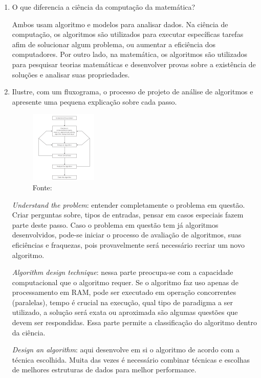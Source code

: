 \documentclass[12pt,a4paper]{article}
\begin{document}
\begin{enumerate}
	
		
	\item O que diferencia a ciência da computação da matemática?
	
	Ambos usam algoritmo e modelos para analisar dados. Na ciência de computação, os algoritmos são utilizados para executar específicas tarefas afim de solucionar algum problema, ou aumentar a eficiência dos computadores. Por outro lado, na matemática, os algoritmos são utilizados para pesquisar teorias matemáticas e desenvolver provas sobre a existência de soluções e analisar suas propriedades.
	
	
		
	\item Ilustre, com um fluxograma, o processo de projeto de análise de algoritmos e apresente uma pequena explicação sobre cada passo.
	
	\begin{figure}[H]
		\centering
		\includegraphics[scale=5]{images/algorithm_design.pdf}
		\caption{Fonte: \cite{levitin2008introduction}}
	\end{figure}

	\textit{Understand the problem}: entender completamente o problema em questão. Criar perguntas sobre, tipos de entradas, pensar em casos especiais fazem parte deste passo. Caso o problema em questão tem já algoritmos desenvolvidos, pode-se iniciar o processo de avaliação de algoritmos, suas eficiências e fraquezas, pois provavelmente será necessário recriar um novo algoritmo.
	
	\textit{Algorithm design technique}: nessa parte preocupa-se com a capacidade computacional que o algoritmo requer. Se o algoritmo faz uso apenas de processamento em RAM, pode ser executado em operação concorrentes (paralelas), tempo é crucial na execução, qual tipo de paradigma a ser utilizado, a solução será exata ou aproximada são algumas questões que devem ser respondidas. Essa parte permite a classificação do algoritmo dentro da ciência.
	
	\textit{Design an algorithm}: aqui desenvolve em si o algoritmo de acordo com a técnica escolhida. Muita das vezes é necessário combinar técnicas e escolhas de melhores estruturas de dados para melhor performance.
	

\end{enumerate}
\end{document}
